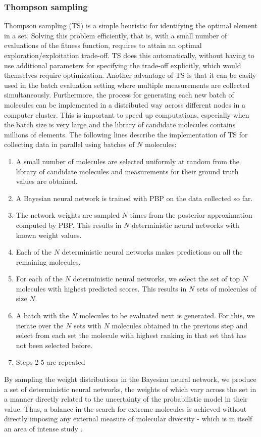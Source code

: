 \subsubsection{Thompson sampling}

Thompson sampling (TS) \cite{Thompson_1933} is a simple heuristic for identifying the optimal element in a set. Solving this problem efficiently, that is, with a small number of evaluations of the fitness function, requires to attain an optimal exploration/exploitation trade-off. TS does this automatically, without having to use additional parameters for specifying the trade-off explicitly, which would themselves require optimization. Another advantage of TS is that it can be easily used
in the batch evaluation setting where multiple measurements are collected simultaneously. Furthermore, the process for generating each new batch of molecules can be implemented in a distributed way across different nodes in a computer cluster. This is important to speed up computations, especially when the batch size is very large and the library of candidate molecules contains millions of elements. The following lines describe the implementation of TS for collecting data in parallel using batches of $N$ molecules:
\begin{enumerate}
\item A small number of molecules are selected uniformly at random from the library of candidate molecules and measurements for their ground truth values are obtained.
\item A Bayesian neural network is trained with PBP on the data collected so far.
\item The network weights are sampled $N$ times from the posterior approximation computed by PBP. This results in $N$ deterministic neural networks with known weight values. 
\item Each of the $N$ deterministic neural networks makes predictions on all the remaining molecules. 
\item For each of the $N$ deterministic neural networks, we select the set of top $N$ molecules with highest predicted scores. This results in $N$ sets of molecules of size $N$.
\item A batch with the $N$ molecules to be evaluated next is generated. For this, we iterate over the $N$ sets with $N$ molecules obtained in the previous step and select from each set the molecule with highest ranking in that set that has not been selected before.
\item Steps 2-5 are repeated
\end{enumerate}
By sampling the weight distributions in the Bayesian neural network, we produce a set of deterministic neural networks, the weights of which vary across the set in a manner directly related to the uncertainty of the probabilistic model in their value.  Thus, a balance in the search for extreme molecules is achieved without directly imposing any external measure of molecular diversity - which is in itself an area of intense study \cite{Maldonado_2006}.